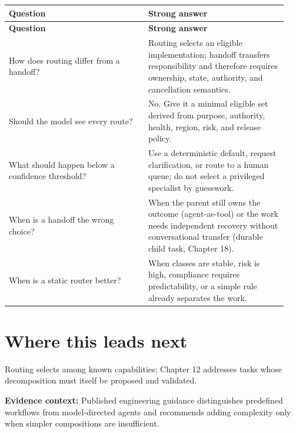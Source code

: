 \BookTableStart
\small
\begin{longtable}{@{}Y{0.4700\linewidth}Y{0.4700\linewidth}@{}}
\color{white}\bfseries \textbf{Question} & \color{white}\bfseries \textbf{Strong answer} \\
\endfirsthead
{}
\color{white}\bfseries \textbf{Question} & \color{white}\bfseries \textbf{Strong answer} \\
\endhead
How does routing differ from a handoff? & Routing selects an eligible implementation; handoff transfers responsibility and therefore requires ownership, state, authority, and cancellation semantics. \\
Should the model see every route? & No. Give it a minimal eligible set derived from purpose, authority, health, region, risk, and release policy. \\
What should happen below a confidence threshold? & Use a deterministic default, request clarification, or route to a human queue; do not select a privileged specialist by guesswork. \\
When is a handoff the wrong choice? & When the parent still owns the outcome (agent-as-tool) or the work needs independent recovery without conversational transfer (durable child task, Chapter 18). \\
When is a static router better? & When classes are stable, risk is high, compliance requires predictability, or a simple rule already separates the work. \\
\end{longtable}
\BookTableEnd

\section{Where this leads next}

Routing selects among known capabilities; Chapter 12 addresses tasks whose decomposition must itself be proposed and validated.\par



\begin{bookquote}

\textbf{Evidence context:} Published engineering guidance distinguishes predefined workflows from model-directed agents and recommends adding complexity only when simpler compositions are insufficient. \textbf{}

\end{bookquote}

